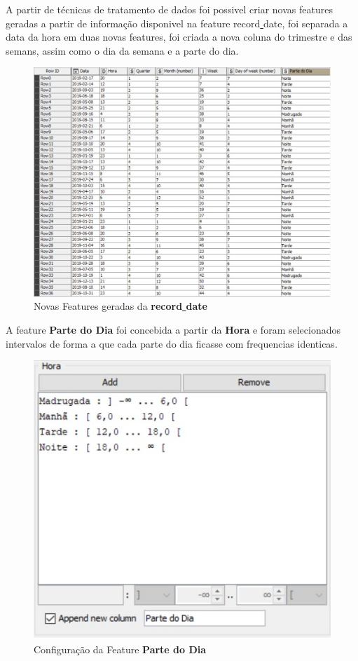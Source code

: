 \documentclass[a4paper,10pt]{article}
\begin{document}
A partir de técnicas de tratamento de dados foi possivel criar novas features geradas a partir de informação disponivel na feature record\underline{ }date, foi separada a data da hora em duas novas features, foi criada a nova coluna do trimestre e das semans, assim como o dia da semana e a parte do dia. 

\begin{figure} [ h! ]
  \includegraphics[width=\linewidth]{imagens/DATAFE.jpg}
  \caption{Novas Features geradas da \textbf{record\underline{ }date}}
  \label{fig:DATAFE}
\end{figure}
\newpage
A feature \textbf{Parte do Dia} foi concebida a partir da \textbf{Hora} e foram selecionados intervalos de forma a que cada parte do dia ficasse com frequencias identicas. 

\begin{figure} [ h! ]
  \includegraphics[width=\linewidth]{imagens/partedodiacode.jpg}
  \caption{Configuração da Feature \textbf{Parte do Dia}}
  \label{fig:partedodiacode}
\end{figure}
\end{document}
